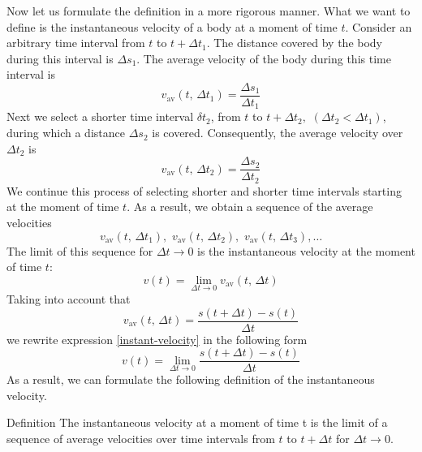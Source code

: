 {Now let us formulate the definition in a more rigorous manner. What we want to define is the instantaneous velocity of a body at a moment of time $t$. Consider an arbitrary time interval from $t$ to $t + \Delta t_{1}$. The distance covered by the body during this interval is $\Delta s_{1}$. The average velocity of the body during this time interval is
\begin{equation*}%
v_{\text{av}}  (t, \, \Delta t_{1}) = \frac{\Delta s_{1}}{\Delta t_{1}} 
\end{equation*}
Next we select a shorter time interval $\delta t_{2}$, from $t$ to $t + \Delta t_{2}, \,\, (\Delta t_{2} < \Delta t_{1})$, during which a distance $\Delta s_{2}$ is covered.  Consequently, the average velocity over $\Delta t_{2}$ is
\begin{equation*}%
v_{\text{av}}  (t, \, \Delta t_{2}) = \frac{\Delta s_{2}}{\Delta t_{2}} 
\end{equation*}
We continue this process of selecting shorter and shorter time intervals starting at the moment of time $t$. As a result, we obtain a sequence of the average velocities
\begin{equation*}%
v_{\text{av}}  (t, \, \Delta t_{1}), \,\, v_{\text{av}}  (t, \, \Delta t_{2}), \,\, v_{\text{av}}  (t, \, \Delta t_{3}), \ldots
\end{equation*}
The limit of this sequence for $ \Delta t \to 0$ is the instantaneous
velocity at the moment of time $t$:
\begin{equation}%
v(t) = \lim\limits_{ \Delta t \to 0} v_{\text{av}}  (t, \, \Delta t)
\label{instant-velocity}
\end{equation}
Taking into account that
\begin{equation*}%
v_{\text{av}}  (t, \, \Delta t) = \frac{s (t + \Delta t) - s(t)}{\Delta t}
\end{equation*}
we rewrite expression \eqref{instant-velocity} in the following form
\begin{equation}%
\boxed{
v(t) = \lim\limits_{ \Delta t \to 0} \frac{s (t + \Delta t) - s(t)}{\Delta t}}
\label{instant-velocity}
\end{equation}
As a result, we can formulate the following definition of the instantaneous velocity.
\begin{mytheo}{Definition}
The instantaneous velocity at a moment of time t is the limit of a sequence of average velocities over time intervals from $t$ to $t + \Delta t$ for $\Delta t \to 0$.
\end{mytheo}

}
